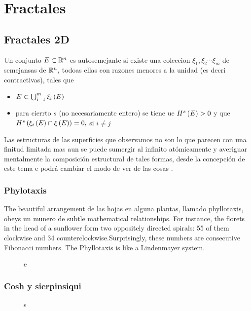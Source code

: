\chapter{Fractales}

\section{Fractales 2D}


Un conjunto $E\subset \mathbb R^n$ es autosemejante si existe una coleccion $\xi_1,\xi_2 \cdots \xi_m$ de semejansas de $\mathbb R^n,$ todoas ellas con razones menores a la unidad (es decri contractivas), tales que

\begin{itemize}
	\item $E\subset \bigcup^m_{i=1}\xi_i\left(E\right)$
	\item para cierrto $s$ (no necesariamente entero) se tiene ue $H^s\left(E\right)>0$ y que $H^s\left(\xi_i\left(E\right)\cap \xi\left(E\right)\right)=0,$ si $i\neq j$
\end{itemize}

Las estructuras de las superficies que observamos no son lo que parecen con una finitud limitada mas aun se puede sumergir al infinito atómicamente y averiguar mentalmente la composición estructural de tales formas, desde  la concepción de este tema e podrá cambiar el modo de ver de las cosas .

\subsection{Phylotaxis}
The beautiful arrangement de las hojas en alguna plantas, llamado phyllotaxis, obeys un munero de subtle mathematical relationships. For instance, the florets in the head of a sunflower form two oppositely directed spirals: 55 of them clockwise and 34 counterclockwise.Surprisingly, these numbers are consecutive Fibonacci numbers. The Phyllotaxis is like a Lindenmayer system.


\begin{figure}[!ht]
	\begin{center}

	\end{center}
	\caption{e}
\end{figure}


\subsection{Cosh y sierpinsiqui}

\begin{figure}[!ht]
	\begin{center}

	\end{center}
	\caption{s}\label{s}
\end{figure}

